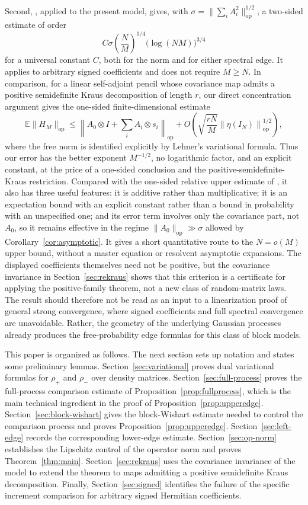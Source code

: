 \documentclass{article}
\newcommand{\E}{\mathbb E}
\newcommand{\op}{\mathrm{op}}
\begin{document}
Second, \cite[Corollary~2.3]{BCSvH2026}, applied to the present model, gives,
with \(\sigma=\|\sum_iA_i^2\|_{\op}^{1/2}\), a two-sided estimate of order
\[
	C\sigma\left(\frac NM\right)^{1/4}
	\bigl(\log(NM)\bigr)^{3/4}
\]
for a universal constant \(C\), both for the norm and for either spectral edge.
It applies to arbitrary signed coefficients and does not require \(M\ge N\).
In comparison, for a linear self-adjoint pencil whose covariance map admits a
positive semidefinite Kraus decomposition of length \(r\), our direct
concentration argument gives the one-sided finite-dimensional estimate
\[
	\E\|H_M\|_{\op}
	\le
	\left\|A_0\otimes I+\sum_i A_i\otimes s_i\right\|_{\op}
	+
	O\!\left(
	\sqrt{\frac{rN}{M}}\left\|\eta(I_N)\right\|_{\op}^{1/2}
	\right),
\]
where the free norm is identified explicitly by Lehner's variational formula.
Thus our error has the better exponent \(M^{-1/2}\), no logarithmic factor, and
an explicit constant, at the price of a one-sided conclusion and the
positive-semidefinite-Kraus restriction.  Compared with the one-sided relative
upper estimate of \cite[Corollary~1.4]{CGVvHClassical}, it also has three useful
features: it is additive rather than multiplicative; it is an expectation bound
with an explicit constant rather than a bound in probability with an unspecified
one; and its error term involves only the covariance part, not \(A_0\), so it
remains effective in the regime \(\|A_0\|_{\op}\gg\sigma\) allowed by
Corollary~\ref{cor:asymptotic}.  It gives a short quantitative route to the
$N=o(M)$ upper bound, without a master equation or resolvent asymptotic
expansions.  The displayed coefficients themselves need not be positive, but
the covariance invariance in Section~\ref{sec:rekraus} shows that this criterion
is a certificate for applying the positive-family theorem, not a new class of
random-matrix laws.  The result should therefore not be read as an input to a
linearization proof of general strong convergence, where signed coefficients
and full spectral convergence are unavoidable.  Rather, the geometry of the
underlying Gaussian processes already produces the free-probability edge
formulas for this class of block models.

This paper is organized as follows.  The next section sets up notation and states
some preliminary lemmas.  Section~\ref{sec:variational} proves dual variational
formulas for $\rho_+$ and $\rho_-$ over density matrices.
Section~\ref{sec:full-process} proves the full-process comparison estimate of
Proposition~\ref{prop:fullprocess}, which is the main technical ingredient in the
proof of Proposition~\ref{prop:upperedge}.  Section~\ref{sec:block-wishart} gives
the block-Wishart estimate needed to control the comparison process and proves
Proposition~\ref{prop:upperedge}.  Section~\ref{sec:left-edge} records the
corresponding lower-edge estimate.  Section~\ref{sec:op-norm} establishes the
Lipschitz control of the operator norm and proves Theorem~\ref{thm:main}.
Section~\ref{sec:rekraus} uses the covariance invariance of the model to extend
the theorem to maps admitting a positive semidefinite Kraus decomposition.
Finally, Section~\ref{sec:signed} identifies the failure of the specific
increment comparison for arbitrary signed Hermitian coefficients.
\end{document}
